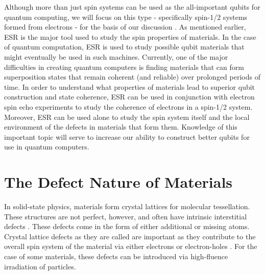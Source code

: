 \documentclass[oneside, astronomy, noacknowlegments]{BYUPhys}
\begin{document}
Although more than just spin systems can be used as the all-important qubits for quantum computing, we will focus on this type - specifically spin-1/2 systems formed from electrons - for the basis of our discussion \cite{RefWorks:doc:58929612e4b0499fa95c50fa}. As mentioned earlier, ESR is the major tool used to study the spin properties of materials. In the case of quantum computation, ESR is used to study possible qubit materials that might eventually be used in such machines. Currently, one of the major difficulties in creating quantum computers is finding materials that can form superposition states that remain coherent (and reliable) over prolonged periods of time. In order to understand what properties of materials lead to superior qubit construction and state coherence, ESR can be used in conjunction with electron spin echo experiments to study the coherence of electrons in a spin-1/2 system. Moreover, ESR can be used alone to study the spin system itself and the local environment of the defects in materials that form them. Knowledge of this important topic will serve to increase our ability to construct better qubits for use in quantum computers.

\section{The Defect Nature of Materials}

In solid-state physics, materials form crystal lattices for molecular tessellation. These structures are not perfect, however, and often have intrinsic interstitial defects \cite{RefWorks:doc:58929264e4b0d4c09201f63b}. These defects come in the form of either additional or missing atoms. Crystal lattice defects as they are called are important as they contribute to the overall spin system of the material via either electrons or electron-holes \cite{RefWorks:doc:58929816e4b0499fa95c51a6}. For the case of some materials, these defects can be introduced via high-fluence irradiation of particles.
\end{document}
